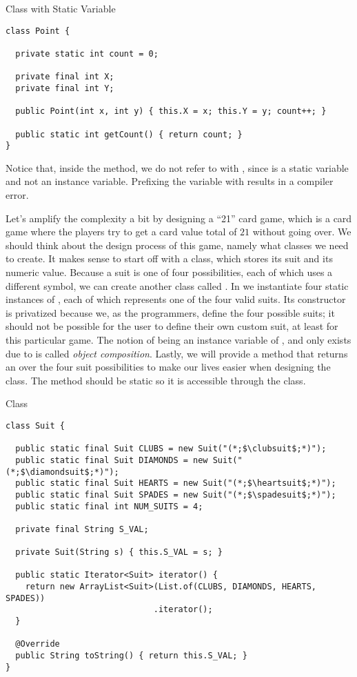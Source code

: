 \begin{cl}{ Class with  Static Variable}
\begin{lstlisting}[language=MyJava]
class Point {

  private static int count = 0;

  private final int X;
  private final int Y;

  public Point(int x, int y) { this.X = x; this.Y = y; count++; }

  public static int getCount() { return count; }
}
\end{lstlisting}
\end{cl}

Notice that, inside the  method, we do not refer to  with , since  is a static variable and not an instance variable. Prefixing the  variable with  results in a compiler error.

\example Let's amplify the complexity a bit by designing a ``21'' card game, which is a card game where the players try to get a card value total of $21$ without going over. We should think about the design process of this game, namely what classes we need to create. It makes sense to start off with a  class, which stores its suit and its numeric value. Because a suit is one of four possibilities, each of which uses a different symbol, we can create another class called . In  we instantiate four static instances of , each of which represents one of the four valid suits. Its constructor is privatized because we, as the programmers, define the four possible suits; it should not be possible for the user to define their own custom suit, at least for this particular game. The notion of  being an instance variable of , and only exists due to  is called \textit{object composition}. Lastly, we will provide a method that returns an  over the four suit possibilities to make our lives easier when designing the  class. The method should be static so it is accessible through the class.

\begin{cl}{ Class}
\begin{lstlisting}[language=MyJava]
class Suit {

  public static final Suit CLUBS = new Suit("(*;$\clubsuit$;*)");
  public static final Suit DIAMONDS = new Suit("(*;$\diamondsuit$;*)");
  public static final Suit HEARTS = new Suit("(*;$\heartsuit$;*)");
  public static final Suit SPADES = new Suit("(*;$\spadesuit$;*)");
  public static final int NUM_SUITS = 4;

  private final String S_VAL;

  private Suit(String s) { this.S_VAL = s; }

  public static Iterator<Suit> iterator() {
    return new ArrayList<Suit>(List.of(CLUBS, DIAMONDS, HEARTS, SPADES))
                              .iterator();
  }

  @Override
  public String toString() { return this.S_VAL; }
}
\end{lstlisting}
\end{cl}

